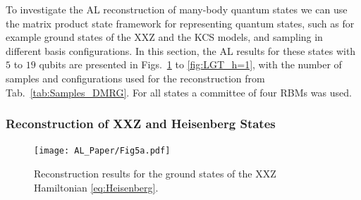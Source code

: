 \documentclass[pra,aps,showpacs,groupedaddress,superscriptaddress,twocolumn,toc=flat,biblatex,footinbib]{revtex4-1}
\begin{document}





To investigate the AL reconstruction of many-body quantum states we can use the matrix product state framework for representing quantum states, such as for example ground states of the XXZ and the KCS models, and sampling in different basis configurations.
In this section, the AL results for these states with $5$ to $19$ qubits are presented in Figs.~\ref{fig:Heisenberg_summary} to \ref{fig:LGT_h=1}, with the number of samples and configurations used for the reconstruction from Tab.~\ref{tab:Samples_DMRG}. For all states a committee of four RBMs was used.

\subsubsection{Reconstruction of XXZ and Heisenberg States}
\begin{figure}[b]
	\centering
   \texttt{[image: AL\_Paper/Fig5a.pdf]}
	\caption[]{Reconstruction results for the ground states of the XXZ Hamiltonian \eqref{eq:Heisenberg}.}
	\label{fig:Heisenberg_summary}
\end{figure}
\end{document}
